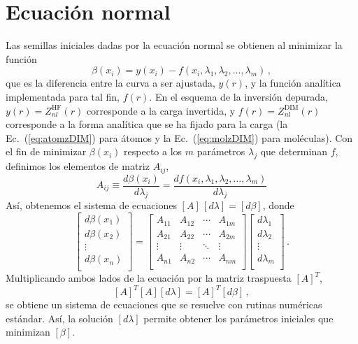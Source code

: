 \appendix

\chapter{Ecuación normal}
\label{app:ecnormal}

Las semillas iniciales dadas por la ecuación normal se obtienen al 
minimizar la función
\begin{equation}
 \beta(x_i) = y(x_i) - f(x_i,\lambda_1,\lambda_2,\dots,\lambda_m)\,,
\end{equation}
que es la diferencia entre la curva a ser ajustada, $y(r)$, y la función
analítica implementada para tal fin, $f(r)$. En el esquema de la inversión
depurada, $y(r) = Z_{nl}^{\mathrm{HF}}(r)$ corresponde a la carga invertida,
y $f(r) = Z_{nl}^{\mathrm{DIM}}(r)$ corresponde a la forma analítica que 
se ha fijado para la carga (la Ec.~(\ref{eq:atomzDIM}) para átomos y 
la Ec.~(\ref{eq:molzDIM}) para moléculas). Con el fin de minimizar
$\beta(x_i)$ respecto a los $m$ parámetros $\lambda_j$ que determinan 
$f$, definimos los elementos de matriz $A_{ij}$,
\begin{equation}
  A_{ij} \equiv \frac{d\beta(x_i)}{d\lambda_j} =
 \frac{df(x_i,\lambda_1,\lambda_2,\dots, \lambda_m)}{d\lambda_j}
\end{equation}
Así, obtenemos el sistema de ecuaciones $[A] \,[d\lambda] = [d\beta]$, donde
\begin{equation}
 \left[
 \begin{array}{c}
  d\beta(x_1) \\
  d\beta(x_2) \\
  \vdots \\
  d\beta(x_n) \\
 \end{array}
 \right] =
 \left[
 \begin{array}{cccc}
  A_{11} & A_{12} & \cdots & A_{1m} \\
  A_{21} & A_{22} & \cdots & A_{2m} \\
  \vdots & \vdots & \ddots & \vdots \\
  A_{n1} & A_{n2} & \cdots & A_{nm} \\
 \end{array}
 \right]
 \left[
 \begin{array}{c}
 d\lambda_1 \\
 d\lambda_2 \\
 \vdots \\
 d\lambda_m \\
 \end{array}
 \right] \,.
\end{equation}
Multiplicando ambos lados de la ecuación por la matriz traspuesta $[A]^{T}$,
\begin{equation}
  \left[ A \right]^T \left[ A \right]\left[ d\lambda \right] =
  \left[ A \right]^T \left[ d\beta \right]\,,
\end{equation}
se obtiene un sistema de ecuaciones que se resuelve con rutinas numéricas 
estándar. Así, la solución $[d\lambda]$ permite obtener los parámetros 
iniciales que minimizan $[\beta]$.

